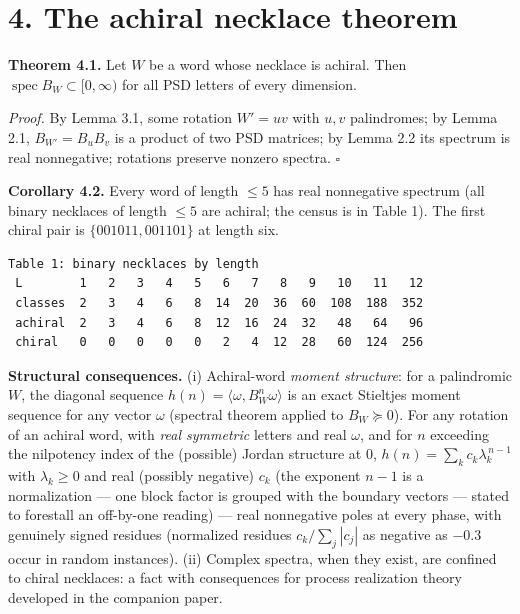 \documentclass[11pt]{article}
\begin{document}
\section*{4. The achiral necklace theorem}
\textbf{Theorem 4.1.}  Let $W$ be a word whose necklace is achiral.  Then $\operatorname{spec} B_W \subset [0,\infty)$ for all PSD letters of every dimension.

\emph{Proof.}  By Lemma 3.1, some rotation $W' = uv$ with $u, v$ palindromes; by Lemma 2.1, $B_{W'} = B_u B_v$ is a product of two PSD matrices; by Lemma 2.2 its spectrum is real nonnegative; rotations preserve nonzero spectra.  $\square$

\textbf{Corollary 4.2.}  Every word of length $\le 5$ has real nonnegative spectrum (all binary necklaces of length $\le 5$ are achiral; the census is in Table 1).  The first chiral pair is $\{001011, 001101\}$ at length six.

\begin{small}\begin{verbatim}
Table 1: binary necklaces by length
 L        1   2   3   4   5   6   7   8   9   10   11   12
 classes  2   3   4   6   8  14  20  36  60  108  188  352
 achiral  2   3   4   6   8  12  16  24  32   48   64   96
 chiral   0   0   0   0   0   2   4  12  28   60  124  256
\end{verbatim}\end{small}
\textbf{Structural consequences.}  (i) Achiral-word \emph{moment structure}: for a palindromic $W$, the diagonal sequence $h(n) = \langle \omega, B_W^n \omega\rangle$ is an exact Stieltjes moment sequence for any vector $\omega$ (spectral theorem applied to $B_W \succeq 0$).  For any rotation of an achiral word, with \emph{real symmetric} letters and real $\omega$, and for $n$ exceeding the nilpotency index of the (possible) Jordan structure at $0$, $h(n) = \sum_k c_k \lambda_k^{\,n-1}$ with $\lambda_k \ge 0$ and real (possibly negative) $c_k$ (the exponent $n-1$ is a normalization — one block factor is grouped with the boundary vectors — stated to forestall an off-by-one reading) — real nonnegative poles at every phase, with genuinely signed residues (normalized residues $c_k/\sum_j|c_j|$ as negative as $-0.3$ occur in random instances). (ii) Complex spectra, when they exist, are confined to chiral necklaces: a fact with consequences for process realization theory developed in the companion paper.
\end{document}
